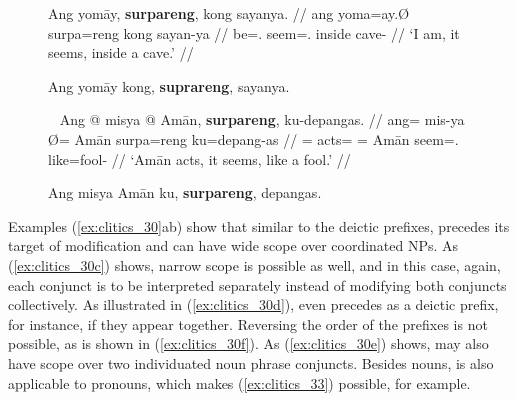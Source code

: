 \begin{figure}[h]
\pex\label{ex:clitics_31}
\a\label{ex:clitics_31a}\begingl
	\gla Ang yomāy, \textbf{surpareng}, kong sayanya. //
	\glb ang yoma=ay.Ø surpa=reng kong sayan-ya //
	\glc \AgtT{} be=\Fsg{}.\Top{} seem=\TsgI{}.\Aarg{} inside cave-\Loc{} //
	\glft `I am, it seems, inside a cave.' //
\endgl


\a\label{ex:clitics_31b}
	Ang yomāy kong, \textbf{suprareng}, sayanya.
\xe
\end{figure}

\begin{figure}[h]
\pex~\label{ex:clitics_32}
\a\label{ex:clitics_32a}\begingl
	\gla Ang @ misya {} @ Amān, \textbf{surpareng}, ku-depangas. //
	\glb ang= mis-ya Ø= Amān surpa=reng ku=depang-as //
	\glc \AgtT{}= acts=\TsgM{} \Top{}= Amān seem=\TsgI{}.\Aarg{} 
		like=fool-\Parg{} //
	\glft `Amān acts, it seems, like a fool.' //
\endgl


\a\label{ex:clitics_32b}\ljudge{*}
	Ang misya Amān ku, \textbf{surpareng}, depangas.
\xe
\end{figure}

Examples (\ref{ex:clitics_30}ab) show that similar to the deictic prefixes,
 precedes its target of modification and can have wide scope
over coordinated NPs. As (\ref{ex:clitics_30c}) shows, narrow scope is possible
as well, and in this case, again, each conjunct is to be interpreted separately
instead of  modifying both conjuncts collectively. As
illustrated in (\ref{ex:clitics_30d}),  even precedes
 as a deictic prefix, for instance, if they appear together.
Reversing the order of the prefixes is not possible, as is shown in
(\ref{ex:clitics_30f}). As (\ref{ex:clitics_30e}) shows,  may
also have scope over two individuated noun phrase conjuncts. Besides nouns,
 is also applicable to pronouns, which makes
(\ref{ex:clitics_33}) possible, for example.

